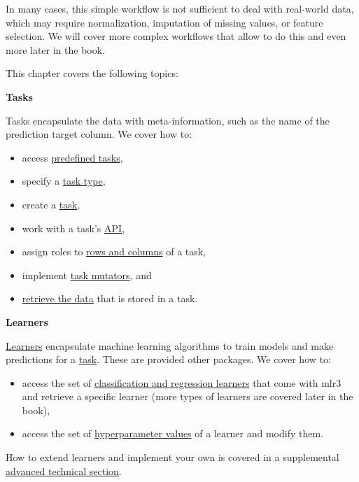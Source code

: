 \documentclass[
]{scrbook}
\providecommand{\tightlist}{%
  \setlength{\itemsep}{0pt}\setlength{\parskip}{0pt}}
\begin{document}
In many cases, this simple workflow is not sufficient to deal with real-world data, which may require normalization, imputation of missing values, or feature selection.
We will cover more complex workflows that allow to do this and even more later in the book.

This chapter covers the following topics:

\textbf{Tasks}

Tasks encapsulate the data with meta-information, such as the name of the prediction target column.
We cover how to:

\begin{itemize}
\tightlist
\item
  access \protect\hyperlink{tasks-predefined}{predefined tasks},
\item
  specify a \protect\hyperlink{tasks-types}{task type},
\item
  create a \protect\hyperlink{tasks-creation}{task},
\item
  work with a task's \protect\hyperlink{tasks-api}{API},
\item
  assign roles to \protect\hyperlink{tasks-roles}{rows and columns} of a task,
\item
  implement \protect\hyperlink{tasks-mutators}{task mutators}, and
\item
  \protect\hyperlink{tasks-retrieving}{retrieve the data} that is stored in a task.
\end{itemize}

\textbf{Learners}

\protect\hyperlink{learners}{Learners} encapsulate machine learning algorithms to train models and make predictions for a \protect\hyperlink{tasks}{task}.
These are provided other packages.
We cover how to:

\begin{itemize}
\tightlist
\item
  access the set of \protect\hyperlink{predefined-learners}{classification and regression learners} that come with mlr3 and retrieve a specific learner (more types of learners are covered later in the book),
\item
  access the set of \protect\hyperlink{learner-api}{hyperparameter values} of a learner and modify them.
\end{itemize}

How to extend learners and implement your own is covered in a supplemental \protect\hyperlink{extending-learners}{advanced technical section}.
\end{document}
